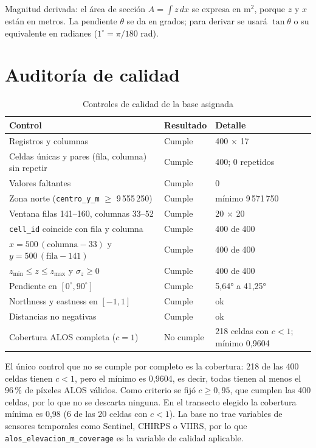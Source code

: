 \documentclass[11pt,a4paper]{article}
\begin{document}
Magnitud derivada: el área de sección $A = \int z\,dx$ se expresa en m$^2$, porque $z$ y $x$ están en metros. La pendiente $\theta$ se da en grados; para derivar se usará $\tan\theta$ o su equivalente en radianes ($1^\circ = \pi/180$ rad).

\section{Auditoría de calidad}
\begin{table}[h]
\centering
\caption{Controles de calidad de la base asignada}\label{tab:aud}
\small
\begin{tabularx}{\linewidth}{Y L{2.0cm} L{4.4cm}}
\toprule
\textbf{Control} & \textbf{Resultado} & \textbf{Detalle}\\
\midrule
Registros y columnas & Cumple & 400 $\times$ 17\\
Celdas únicas y pares (fila, columna) sin repetir & Cumple & 400; 0 repetidos\\
Valores faltantes & Cumple & 0\\
Zona norte (\texttt{centro\_y\_m} $\geq$ 9\,555\,250) & Cumple & mínimo 9\,571\,750\\
Ventana filas 141--160, columnas 33--52 & Cumple & 20 $\times$ 20\\
\texttt{cell\_id} coincide con fila y columna & Cumple & 400 de 400\\
$x = 500\,(\text{columna}-33)$ y $y = 500\,(\text{fila}-141)$ & Cumple & 400 de 400\\
$z_{\min} \leq z \leq z_{\max}$ y $\sigma_z \geq 0$ & Cumple & 400 de 400\\
Pendiente en $[0^\circ, 90^\circ]$ & Cumple & 5,64° a 41,25°\\
Northness y eastness en $[-1, 1]$ & Cumple & ok\\
Distancias no negativas & Cumple & ok\\
Cobertura ALOS completa ($c = 1$) & No cumple & 218 celdas con $c < 1$; mínimo 0,9604\\
\bottomrule
\end{tabularx}
\end{table}

El único control que no se cumple por completo es la cobertura: 218 de las 400 celdas tienen $c < 1$, pero el mínimo es 0,9604, es decir, todas tienen al menos el 96\,\% de píxeles ALOS válidos. Como criterio se fijó $c \geq 0{,}95$, que cumplen las 400 celdas, por lo que no se descarta ninguna. En el transecto elegido la cobertura mínima es 0,98 (6 de las 20 celdas con $c < 1$). La base no trae variables de sensores temporales como Sentinel, CHIRPS o VIIRS, por lo que \texttt{alos\_elevacion\_m\_coverage} es la variable de calidad aplicable.
\end{document}
